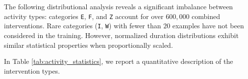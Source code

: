 \documentclass[preprint,12pt]{elsarticle}
\begin{document}
The following distributional analysis reveals a significant imbalance between activity types: categories \texttt{E}, \texttt{F}, and \texttt{Z} account for over $600,000$ combined interventions. Rare categories (\texttt{I}, \texttt{W}) with fewer than $20$ examples have not been considered in the training. However, normalized duration distributions exhibit similar statistical properties when proportionally scaled.


In Table \ref{tab:activity_statistics}, we report a quantitative description of the intervention types. 



\begingroup
\scriptsize                      %
\setlength{\tabcolsep}{3pt}      %
\renewcommand{\arraystretch}{0.9}%
\end{document}
